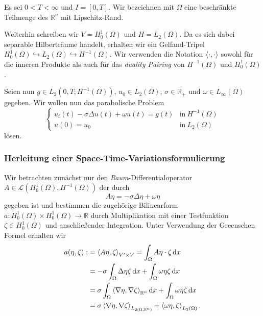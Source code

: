 Es sei $0 < T < \infty$ und $I = [0, T]$.
Wir bezeichnen mit $\Omega$ eine beschränkte Teilmenge des $\mathbb{R}^{n}$ mit Lipschitz-Rand.

Weiterhin schreiben wir $V = H^{1}_{0}(\Omega)$ und $H = L_{2}(\Omega)$.
Da es sich dabei separable Hilberträume handelt, erhalten wir ein Gelfand-Tripel $H^{1}_{0}(\Omega) \hookrightarrow L_{2}(\Omega) \hookrightarrow H^{-1}(\Omega)$.
Wir verwenden die Notation $\left\langle\cdot,\cdot\right\rangle$ sowohl für die inneren Produkte als auch für das \emph{duality Pairing} von $H^{-1}(\Omega)$ und $H^{1}_{0}(\Omega)$.

Seien nun $g \in L_{2}(0, T; H^{-1}(\Omega))$, $u_{0} \in L_{2}(\Omega)$, $\sigma \in \mathbb{R_{+}}$ und $\omega \in L_{\infty}(\Omega)$ gegeben.
Wir wollen nun das parabolische Problem
\begin{equation}
    \begin{cases}
        u_{t}(t) - \sigma \Delta u(t) + \omega u(t) = g(t) & \text{in}~H^{-1}(\Omega)\\
        u(0) = u_{0} & \text{in}~L_{2}(\Omega)
    \end{cases}
\end{equation}
lösen.

\subsubsection{Herleitung einer Space-Time-Variationsformulierung} %

Wir betrachten zunächst nur den \emph{Raum}-Differentialoperator $A \in \mathcal L(H^{1}_{0}(\Omega), H^{-1}(\Omega))$ der durch
\begin{equation}
    A \eta = - \sigma \Delta \eta + \omega \eta
\end{equation}
gegeben ist und bestimmen die zugehörige Bilinearform $a \colon H^{1}_{0}(\Omega) \times H^{1}_{0}(\Omega) \to \mathbb{R}$ durch Multiplikation mit einer Testfunktion $\zeta \in H^{1}_{0}(\Omega)$ und anschließender Integration.
Unter Verwendung der Greenschen Formel erhalten wir
\begin{equation}
    \label{eq:a_bf}
    \begin{aligned}
        a(\eta, \zeta)
        :&= \left\langle A \eta,\zeta\right\rangle_{V' \times V}
        = \int_{\Omega} A \eta \cdot \zeta \mathop{}\!\mathrm{d} x
        \\&= - \sigma \int_{\Omega} \Delta \eta \zeta \mathop{}\!\mathrm{d} x + \int_{\Omega} \omega \eta \zeta \mathop{}\!\mathrm{d} x
        \\ &= \sigma \int_{\Omega} \left\langle\nabla \eta,\nabla \zeta\right\rangle_{\mathbb{R}^{n}} \mathop{}\!\mathrm{d} x + \int_{\Omega} \omega \eta \zeta \mathop{}\!\mathrm{d} x
        \\&= \sigma \left\langle\nabla \eta,\nabla \zeta\right\rangle_{L_{2(\Omega, \mathbb{R}^{n})}} + \left\langle\omega \eta,\zeta\right\rangle_{L_{2}(\Omega)}.
    \end{aligned}
\end{equation}

